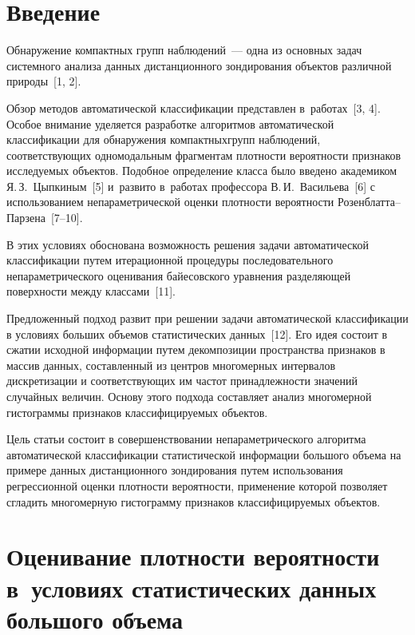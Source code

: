 \begin{multicols}{2}

\label{st\stat}
  
\section{Введение}

\vspace*{-4pt}

  Обнаружение компактных групп наблюдений~--- одна из основных задач 
системного анализа данных дистанционного зондирования объектов различной 
природы~[1, 2]. 

Обзор методов автоматической классификации представлен 
в~работах~[3, 4]. Особое внимание уделяется разработке алгоритмов 
автоматической классификации для обнаружения компактных\linebreak групп 
наблюдений, со\-от\-вет\-ст\-ву\-ющих одномодальным фрагментам плот\-ности 
ве\-ро\-ят\-ности признаков ис\-сле\-ду\-емых объектов. Подобное определение класса 
было введено академиком Я.\,З.~\mbox{Цыпкиным}~[5] и~развито в~работах 
профессора В.\,И.~Васильева~[6] с использованием непараметрической оценки 
плотности вероятности Ро\-зен\-блат\-та--Пар\-зе\-на~[7--10].
  
  В этих условиях обоснована возможность решения задачи автоматической 
классификации путем итерационной процедуры последовательного 
непараметрического оценивания байесовского уравнения разделяющей 
поверхности между классами~[11]. 

Предложенный подход развит при решении 
задачи автоматической классификации в условиях больших объемов 
статистических данных~[12]. Его идея состоит в сжатии исходной информации 
путем декомпозиции пространства признаков в массив данных, составленный 
из центров многомерных интервалов дискретизации и соответствующих им 
частот принадлежности значений случайных величин. Основу этого подхода 
составляет анализ многомерной гистограммы признаков классифицируемых 
объектов.
  
  Цель статьи состоит в совершенствовании непараметрического алгоритма 
автоматической классификации статистической информации большого объема 
на примере данных дистанционного зондирования путем использования 
регрессионной оценки плотности вероятности, применение которой позволяет 
сгладить многомерную гистограмму признаков классифицируемых объектов.

\section{Оценивание плотности вероятности в~условиях 
статистических данных большого объема}


\end{multicols}
